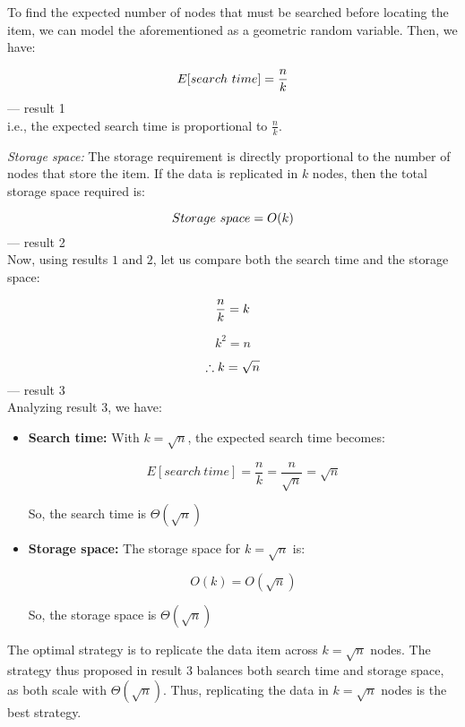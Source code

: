 \documentclass[11pt]{article}
\begin{document}
    To find the expected number of nodes that must be searched before locating the item, we can model the aforementioned as a geometric random variable. Then, we have:

        \[
            E[search\ time] = \frac{n}{k}\\
        \] \null\hfill --- result 1\\

    i.e., the expected search time is proportional to $\frac{n}{k}$.

    \emph{Storage space:} The storage requirement is directly proportional to the number of nodes that store the item. If the data is replicated in \(k\) nodes, then the total storage space required is:

        \[
            Storage\ space = O(k)\\
        \] \null\hfill --- result 2\\

    Now, using results \(1\) and \(2\), let us compare both the search time and the storage space:

        \[
            \frac{n}{k} = k\\
        \]

        \[
            k^{2} = n
        \]
        
        \[
            \therefore k = \sqrt{n}\\
        \] \null\hfill --- result 3\\

    Analyzing result \(3\), we have:

    \begin{itemize}
        \item \textbf{Search time:} With \(k = \sqrt{n}\), the expected search time becomes:

            \[
                E[search\ time] = \frac{n}{k} = \frac{n}{\sqrt{n}} = \sqrt{n}
            \]

        So, the search time is $\Theta(\sqrt{n})$

        \item \textbf{Storage space:} The storage space for \(k = \sqrt{n}\) is:

            \[
                O(k) = O(\sqrt{n})
            \]

        So, the storage space is $\Theta(\sqrt{n})$
    \end{itemize}

    The optimal strategy is to replicate the data item across \(k = \sqrt{n}\) nodes. The strategy thus proposed in result \(3\) balances both search time and storage space, as both scale with $\Theta(\sqrt{n})$. Thus, replicating the data in \(k = \sqrt{n}\) nodes is the best strategy.
\end{document}
